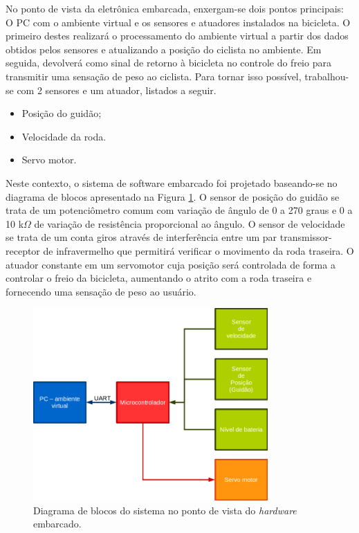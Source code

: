 No ponto de vista da eletrônica embarcada, enxergam-se dois pontos principais: O PC com o ambiente virtual e os sensores e atuadores instalados na bicicleta. O primeiro destes realizará o processamento do ambiente virtual a partir dos dados obtidos pelos sensores e atualizando a posição do ciclista no ambiente. Em seguida, devolverá como sinal de retorno à bicicleta no controle do freio para transmitir uma sensação de peso ao ciclista. Para tornar isso possível, trabalhou-se com 2 sensores e um atuador, listados a seguir.


\begin {itemize}
	\item Posição do guidão;
	\item Velocidade da roda.
	\item Servo motor.
\end  {itemize}

Neste contexto, o sistema de software embarcado foi projetado baseando-se no diagrama de blocos apresentado na Figura \ref{blocos}. O sensor de posição do guidão se trata de um potenciômetro comum com variação de ângulo de 0 a 270 graus e 0 a 10 k$\Omega$ de variação de resistência proporcional ao ângulo. O sensor de velocidade se trata de um conta giros através de interferência entre um par transmissor-receptor de infravermelho que permitirá verificar o movimento da roda traseira. O atuador constante em um servomotor cuja posição será controlada de forma a controlar o freio da bicicleta, aumentando o atrito com a roda traseira e fornecendo uma sensação de peso ao usuário.

\begin{figure}[h]
  \centering
  \includegraphics[width=0.8\textwidth]
      {figuras/diag_blocos_elet1.png}
  \caption{Diagrama de blocos do sistema no ponto de vista do \textit{hardware} embarcado.}
  \label{blocos}
\end{figure}


